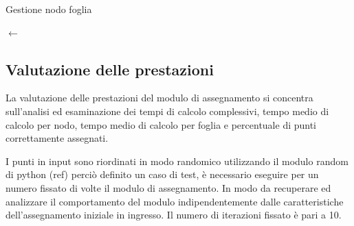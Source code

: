 \documentclass[a4paper,12pt]{report}
\begin{document}
  \begin{algorithm}[H]
  \caption{Gestione nodo foglia}\label{alg:gestione_nodo_foglia}
  \perm $\leftarrow$ \genPerm{\primo} \\
   {
     {
    }
  }
\end{algorithm}

\subsection{Valutazione delle prestazioni}
La valutazione delle prestazioni del modulo di assegnamento si concentra sull'analisi ed esaminazione dei tempi di calcolo complessivi, tempo medio di calcolo per nodo, tempo medio di calcolo per foglia e percentuale di punti correttamente assegnati.

I punti in input sono riordinati in modo randomico utilizzando il modulo random di python (ref) perciò definito un caso di test, è necessario eseguire per un numero fissato di volte il modulo di assegnamento. In modo da recuperare ed analizzare il comportamento del modulo indipendentemente dalle caratteristiche dell'assegnamento iniziale in ingresso. Il numero di iterazioni fissato è pari a 10.
\end{document}

